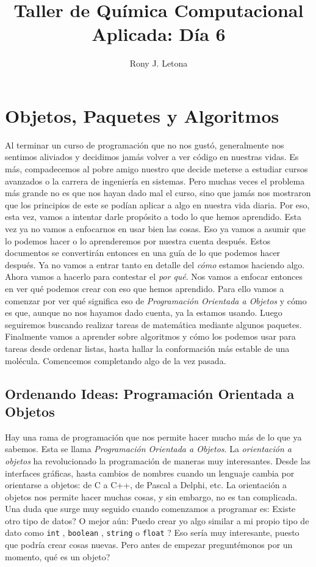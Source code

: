 \documentclass[10pt,letterpaper]{article}
\author{Rony J. Letona}
\title{Taller de Qu\'imica Computacional Aplicada: D\'ia 6}
\newcommand{\inlinecode}[1]{
\colorbox{light-gray}{\texttt{#1}}
}
\begin{document}
\maketitle

\section{Objetos, Paquetes y Algoritmos}
Al terminar un curso de programaci\'on que no nos gust\'o, generalmente nos sentimos aliviados y decidimos jam\'as volver a ver c\'odigo en nuestras vidas. Es m\'as, compadecemos al pobre amigo nuestro que decide meterse a estudiar cursos avanzados o la carrera de ingenier\'ia en sistemas. Pero muchas veces el problema m\'as grande no es que nos hayan dado mal el curso, sino que jam\'as nos mostraron que los principios de este se pod\'ian aplicar a algo en nuestra vida diaria. Por eso, esta vez, vamos a intentar darle prop\'osito a todo lo que hemos aprendido. Esta vez ya no vamos a enfocarnos en usar bien las cosas. Eso ya vamos a asumir que lo podemos hacer o lo aprenderemos por nuestra cuenta despu\'es. Estos documentos se convertir\'an entonces en una gu\'ia de lo que podemos hacer despu\'es. Ya no vamos a entrar tanto en detalle del \emph{c\'omo} estamos haciendo algo. Ahora vamos a hacerlo para contestar el \emph{por qu\'e}. Nos vamos a enfocar entonces en ver qu\'e podemos crear con eso que hemos aprendido. Para ello vamos a comenzar por ver qu\'e significa eso de \emph{Programaci\'on Orientada a Objetos} y c\'omo es que, aunque no nos hayamos dado cuenta, ya la estamos usando. Luego seguiremos buscando realizar tareas de matem\'atica mediante algunos paquetes. Finalmente vamos a aprender sobre algoritmos y c\'omo los podemos usar para tareas desde ordenar listas, hasta hallar la conformaci\'on m\'as estable de una mol\'ecula. Comencemos completando algo de la vez pasada.

\subsection{Ordenando Ideas: Programaci\'on Orientada a Objetos}
Hay una rama de programaci\'on que nos permite hacer mucho m\'as de lo que ya sabemos. Esta se llama \emph{Programaci\'on Orientada a Objetos}. La \emph{orientaci\'on a objetos} ha revolucionado la programaci\'on de maneras muy interesantes. Desde las interfaces gr\'aficas, hasta cambios de nombres cuando un lenguaje cambia por orientarse a objetos: de C a C++, de Pascal a Delphi, etc. La orientaci\'on a objetos nos permite hacer muchas cosas, y sin embargo, no es tan complicada. Una duda que surge muy seguido cuando comenzamos a programar es: Existe otro tipo de datos? O mejor a\'un: Puedo crear yo algo similar a mi propio tipo de dato como \inlinecode{int}, \inlinecode{boolean}, \inlinecode{string} o \inlinecode{float}? Eso ser\'ia muy interesante, puesto que podr\'ia crear cosas nuevas. Pero antes de empezar pregunt\'emonos por un momento, qu\'e es un objeto?\\
\end{document}
